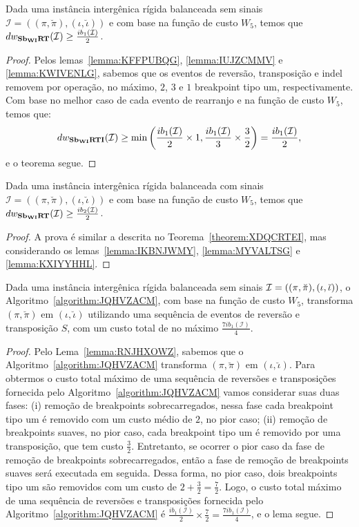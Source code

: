 \begin{theorem}\label{theorem:XDQCRTEI}
Dada uma instância intergênica rígida balanceada sem sinais $\mathcal{I}=((\pi,\breve\pi),(\iota,\breve\iota))$ e com base na função de custo $W_5$, temos que $dw_{\textbf{Sb\textsubscript{WI}RT}}(\mathcal{I}) \ge \frac{ib_1(\mathcal{I})}{2}$.
\begin{proof}
Pelos lemas~\ref{lemma:KFFPUBQG}, \ref{lemma:IUJZCMMV} e \ref{lemma:KWIVENLG}, sabemos que os eventos de reversão, transposição e indel removem por operação, no máximo, $2$, $3$ e $1$ breakpoint tipo um, respectivamente. Com base no melhor caso de cada evento de rearranjo e na função de custo $W_5$, temos que:
$$dw_{\textbf{Sb\textsubscript{WI}RTI}}(\mathcal{I}) \ge \min\left(\frac{ib_1(\mathcal{I})}{2} \times 1,\frac{ib_1(\mathcal{I})}{3} \times \frac{3}{2}\right) = \frac{ib_1(\mathcal{I})}{2},$$ e o teorema segue.
\end{proof}
\end{theorem}

\begin{theorem}\label{theorem:MCKFPIOP}
Dada uma instância intergênica rígida balanceada com sinais $\mathcal{I}=((\pi,\breve\pi),(\iota,\breve\iota))$ e com base na função de custo $W_5$, temos que $dw_{\textbf{Sb\textsubscript{WI}RT}}(\mathcal{I}) \ge \frac{ib_2(\mathcal{I})}{2}$.
\begin{proof}
A prova é similar a descrita no Teorema~\ref{theorem:XDQCRTEI}, mas considerando os lemas~\ref{lemma:IKBNJWMY}, \ref{lemma:MYVALTSG} e \ref{lemma:KXIYYHHL}.
\end{proof}
\end{theorem}

\begin{lemma}\label{lemma:ODPHCEIG}
Dada uma instância intergênica rígida balanceada sem sinais $\mathcal{I}=((\pi,\breve\pi),\break(\iota,\breve\iota))$, o Algoritmo~\ref{algorithm:JQHVZACM}, com base na função de custo $W_5$, transforma $(\pi,\breve\pi)$ em $(\iota,\breve\iota)$ utilizando uma sequência de eventos de reversão e transposição $S$, com um custo total de no máximo $\frac{7ib_1(\mathcal{I})}{4}$.
\end{lemma}
\begin{proof}
Pelo Lema~\ref{lemma:RNJHXOWZ}, sabemos que o Algoritmo~\ref{algorithm:JQHVZACM} transforma $(\pi,\breve\pi)$ em $(\iota,\breve\iota)$. Para obtermos o custo total máximo de uma sequência de reversões e transposições fornecida pelo Algoritmo~\ref{algorithm:JQHVZACM} vamos considerar suas duas fases: (i) remoção de breakpoints sobrecarregados, nessa fase cada breakpoint tipo um é removido com um custo médio de $2$, no pior caso; (ii) remoção de breakpoints suaves, no pior caso, cada breakpoint tipo um é removido por uma transposição, que tem custo $\frac{3}{2}$. Entretanto, se ocorrer o pior caso da fase de remoção de breakpoints sobrecarregados, então a fase de remoção de breakpoints suaves será executada em seguida. Dessa forma, no pior caso, dois breakpoints tipo um são removidos com um custo de $2 + \frac{3}{2} = \frac{7}{2}$. Logo, o custo total máximo de uma sequência de reversões e transposições fornecida pelo Algoritmo~\ref{algorithm:JQHVZACM} é $\frac{ib_1(\mathcal{I})}{2} \times \frac{7}{2} = \frac{7ib_1(\mathcal{I})}{4}$, e o lema segue. 
\end{proof}

